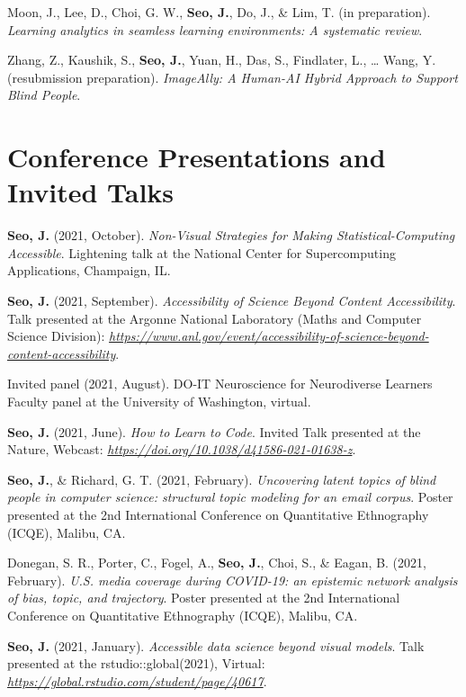 \documentclass[11pt,a4paper,]{awesome-cv}
\begin{document}
\hypertarget{refs_working_paper}{}
\leavevmode{}%
Moon, J., Lee, D., Choi, G. W., \textbf{Seo, J.}, Do, J., \& Lim, T. (in
preparation). \emph{Learning analytics in seamless learning
environments: A systematic review}.

\leavevmode{}%
Zhang, Z., Kaushik, S., \textbf{Seo, J.}, Yuan, H., Das, S., Findlater,
L., \ldots{} Wang, Y. (resubmission preparation). \emph{{ImageAlly}: A
{Human-AI Hybrid Approach} to {Support Blind People}}.

\hypertarget{conference-presentations-and-invited-talks}{%
\section{Conference Presentations and Invited
Talks}\label{conference-presentations-and-invited-talks}}

\textbf{Seo, J.} (2021, October). \emph{Non-Visual Strategies for Making
Statistical-Computing Accessible}. Lightening talk at the National
Center for Supercomputing Applications, Champaign, IL.

\textbf{Seo, J.} (2021, September). \emph{Accessibility of Science
Beyond Content Accessibility}. Talk presented at the Argonne National
Laboratory (Maths and Computer Science Division):
\emph{\url{https://www.anl.gov/event/accessibility-of-science-beyond-content-accessibility}}.

Invited panel (2021, August). DO-IT Neuroscience for Neurodiverse
Learners Faculty panel at the University of Washington, virtual.

\textbf{Seo, J.} (2021, June). \emph{How to Learn to Code}. Invited Talk
presented at the Nature, Webcast:
\emph{\url{https://doi.org/10.1038/d41586-021-01638-z}}.

\textbf{Seo, J.}, \& Richard, G. T. (2021, February). \emph{Uncovering
latent topics of blind people in computer science: structural topic
modeling for an email corpus}. Poster presented at the 2nd International
Conference on Quantitative Ethnography (ICQE), Malibu, CA.

Donegan, S. R., Porter, C., Fogel, A., \textbf{Seo, J.}, Choi, S., \&
Eagan, B. (2021, February). \emph{U.S. media coverage during COVID-19:
an epistemic network analysis of bias, topic, and trajectory}. Poster
presented at the 2nd International Conference on Quantitative
Ethnography (ICQE), Malibu, CA.

\textbf{Seo, J.} (2021, January). \emph{Accessible data science beyond
visual models}. Talk presented at the rstudio::global(2021), Virtual:
\emph{\url{https://global.rstudio.com/student/page/40617}}.
\end{document}
